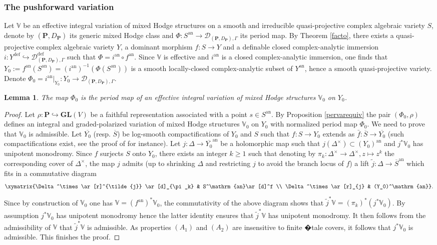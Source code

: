 \documentclass[10pt]{article}
\numberwithin{equation}{subsection}
\theoremstyle{plain}
\newtheorem{lemma}[theorem]{Lemma}
\theoremstyle{definition}
\theoremstyle{remark}
\newcommand{\V}{\mathbb V}
\newcommand{\pp}{\mathbf P}
\newcommand{\an}{\mathrm{an}}
\newcommand{\gl}{\mathbf{GL}}
\newcommand{\period}{\mathscr{D}}
\newcommand{\deef}{\mathrm{def}}
\begin{document}
\subsubsection*{The pushforward variation}
Let $\V$ be an effective integral variation of mixed Hodge structures on a smooth and irreducible quasi-projective complex algebraic variety $S$, denote by $(\pp, D_\pp)$ its generic mixed Hodge class and $\Phi : S^\an \rightarrow \period_{(\pp, D_\pp), \Gamma}$ its period map. By Theorem \ref{facto}, there exists a quasi-projective complex algebraic variety $Y$, a dominant morphism $f : S \rightarrow Y$ and a definable closed complex-analytic immersion $i : Y^\deef \hookrightarrow \period_{(\pp, D_\pp), \Gamma}^\deef$ such that $\Phi = i^\an \circ f^\an$. Since $\V$ is effective and $i^\an$ is a closed complex-analytic immersion, one finds that $Y_0 := f^\an(S^\an) = (i^\an)^{-1}(\Phi(S^\an))$ is a smooth locally-closed complex-analytic subset of $Y^\an$, hence a smooth quasi-projective variety. Denote $\Phi_0 = i^\an \vert_{Y_0} : Y_0 \rightarrow \period_{(\pp, D_\pp), \Gamma}$.
\begin{lemma}\label{auxper}
The map $\Phi_0$ is the period map of an effective integral variation of mixed Hodge structures $\V_0$ on $Y_0$.
\end{lemma}
\begin{proof}
Let $\rho : \pp \hookrightarrow \gl(V)$ be a faithful representation associated with a point $s \in S^\an$. By Proposition \ref{pervarequiv} the pair $(\Phi_0, \rho)$ defines an integral and graded-polarized variation of mixed Hodge structures $\V_0$ on $Y_0$ with normalized period map $\Phi_0$. We need to prove that $\V_0$ is admissible. Let $\overline{Y_0}$ (resp. $\overline{S}$) be log-smooth compactifications of $Y_0$ and $S$ such that $f : S \rightarrow Y_0$ extends as $\bar{f} : \overline{S} \rightarrow \overline{Y_0}$ (such compactifications exist, see the proof of \cite[Lem. 3.5]{gao15} for instance). Let $j : \Delta \rightarrow \overline{Y_0}^\an$ be a holomorphic map such that $j(\Delta^\times) \subset (Y_0)^\an$ and $j^\ast \V_0$ has unipotent monodromy. Since $f$ surjects $S$ onto $Y_0$, there exists an integer $k \geqslant 1$ such that denoting by $\pi_k : \Delta^\times \rightarrow \Delta^\times, z \mapsto z^k$ the corresponding cover of $\Delta^\times$, the map $j$ admits (up to shrinking $\Delta$ and restricting $j$ to avoid the branch locus of $f$) a lift $\tilde{j} : \Delta \rightarrow \overline{S}^\an$ which fits in a commutative diagram
\[
\xymatrix{\Delta^\times \ar[r]^{\tilde{j}} \ar[d]_{\pi_k} & S^\an \ar[d]^f \\ \Delta^\times \ar[r]_{j} & (Y_0)^\an}.
\]
Since by construction of $\V_0$ one has $\V = (f^\an)^\ast \V_0$, the commutativity of the above diagram shows that $\tilde{j}^\ast \V = (\pi_k)^\ast(j^\ast \V_0)$. By assumption $j^\ast \V_0$ has unipotent monodromy hence the latter identity ensures that $\tilde{j}^\ast \V$ has unipotent monodromy. It then follows from the admissibility of $\V$ that $\tilde{j}^\ast \V$ is admissible. As properties $(A_1)$ and $(A_2)$ are insensitive to finite �tale covers, it follows that $j^\ast \V_0$ is admissible. This finishes the proof.
\end{proof}
\end{document}

